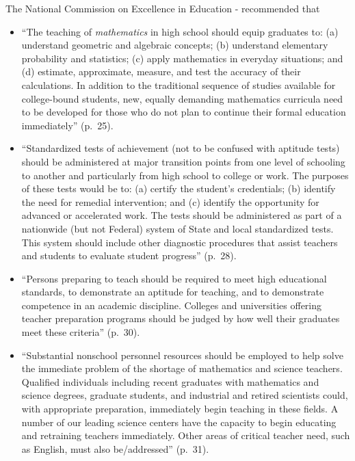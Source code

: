 \documentclass[
]{book}
\theoremstyle{definition}
\theoremstyle{definition}
\theoremstyle{definition}
\theoremstyle{definition}
\theoremstyle{remark}
\begin{document}
The National Commission on Excellence in Education -\citet{NCEE1983} recommended that

\begin{itemize}
\item
  ``The teaching of \emph{mathematics} in high school should equip graduates to: (a) understand geometric and algebraic concepts; (b) understand elementary probability and statistics; (c) apply mathematics in everyday situations; and (d) estimate, approximate, measure, and test the accuracy of their calculations. In addition to the traditional sequence of studies available for college-bound students, new, equally demanding mathematics curricula need to be developed for those who do not plan to continue their formal education immediately'' (p.~25).
\item
  ``Standardized tests of achievement (not to be confused with aptitude tests) should be administered at major transition points from one level of schooling to another and particularly from high school to college or work. The purposes of these tests would be to: (a) certify the student's credentials; (b) identify the need for remedial intervention; and (c) identify the opportunity for advanced or accelerated work. The tests should be administered as part of a nationwide (but not Federal) system of State and local standardized tests. This system should include other diagnostic procedures that assist teachers and students to evaluate student progress'' (p.~28).
\item
  ``Persons preparing to teach should be required to meet high educational standards, to demonstrate an aptitude for teaching, and to demonstrate competence in an academic discipline. Colleges and universities offering teacher preparation programs should be judged by how well their graduates meet these criteria'' (p.~30).
\item
  ``Substantial nonschool personnel resources should be employed to help solve the immediate problem of the shortage of mathematics and science teachers. Qualified individuals including recent graduates with mathematics and science degrees, graduate students, and industrial and retired scientists could, with appropriate preparation, immediately begin teaching in these fields. A number of our leading science centers have the capacity to begin educating and retraining teachers immediately. Other areas of critical teacher need, such as English, must also be/addressed'' (p.~31).
\end{itemize}
\end{document}
